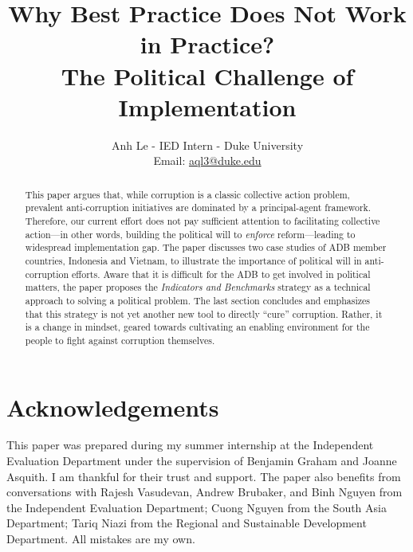 \documentclass[12pt]{article}
\title{Why Best Practice Does Not Work in Practice?\\
        The Political Challenge of Implementation}
\author{Anh Le - IED Intern - Duke University\\
            Email: \href{mailto:aql3@duke.edu}{aql3@duke.edu} }
\date{}
\begin{document}
\maketitle

\begin{abstract}
This paper argues that, while corruption is a classic collective action problem, prevalent anti-corruption initiatives are dominated by a principal-agent framework. Therefore, our current effort does not pay sufficient attention to facilitating collective action---in other words, building the political will to \textit{enforce} reform---leading to widespread implementation gap. The paper discusses two case studies of ADB member countries, Indonesia and Vietnam, to illustrate the importance of political will in anti-corruption efforts. Aware that it is difficult for the ADB to get involved in political matters, the paper proposes the \textit{Indicators and Benchmarks} strategy as a technical approach to solving a political problem. The last section concludes and emphasizes that this strategy is not yet another new tool to directly ``cure'' corruption. Rather, it is a change in mindset, geared towards cultivating an enabling environment for the people to fight against corruption themselves.
\end{abstract}

\newpage
\thispagestyle{plain}
\begin{singlespace}
  \tableofcontents
  \listoffigures
\end{singlespace}
\begin{doublespace}
  \renewcommand{\figurename}{Box}
\end{doublespace}

\section*{Acknowledgements}
This paper was prepared during my summer internship at the Independent Evaluation Department under the supervision of Benjamin Graham and Joanne Asquith. I am thankful for their trust and support. The paper also benefits from conversations with Rajesh Vasudevan, Andrew Brubaker, and Binh Nguyen from the Independent Evaluation Department; Cuong Nguyen from the South Asia Department; Tariq Niazi from the Regional and Sustainable Development Department. All mistakes are my own.
\end{document}
